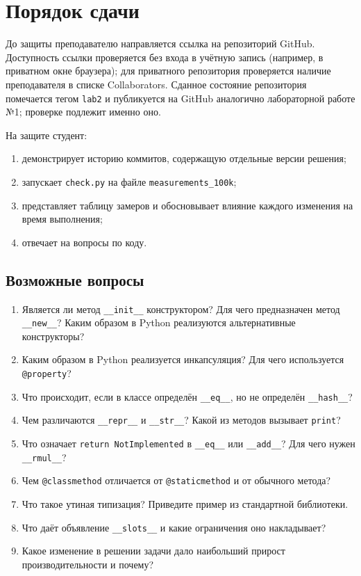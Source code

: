 \documentclass[11pt,a4paper]{article}
\newcommand{\code}[1]{\texttt{#1}}
\begin{document}
\section{Порядок сдачи}

До защиты преподавателю направляется ссылка на репозиторий GitHub. Доступность ссылки
проверяется без входа в учётную запись (например, в приватном окне браузера); для приватного
репозитория проверяется наличие преподавателя в списке Collaborators. Сданное состояние
репозитория помечается тегом \code{lab2} и публикуется на GitHub аналогично лабораторной
работе №1; проверке подлежит именно оно.

На защите студент:
\begin{enumerate}
  \item демонстрирует историю коммитов, содержащую отдельные версии решения;
  \item запускает \code{check.py} на файле \code{measurements\_100k};
  \item представляет таблицу замеров и обосновывает влияние каждого изменения на время выполнения;
  \item отвечает на вопросы по коду.
\end{enumerate}

\subsection*{Возможные вопросы}

\begin{enumerate}
  \item Является ли метод \code{\_\_init\_\_} конструктором? Для чего предназначен метод
        \code{\_\_new\_\_}? Каким образом в Python реализуются альтернативные конструкторы?
  \item Каким образом в Python реализуется инкапсуляция? Для чего используется \code{@property}?
  \item Что происходит, если в классе определён \code{\_\_eq\_\_}, но не определён \code{\_\_hash\_\_}?
  \item Чем различаются \code{\_\_repr\_\_} и \code{\_\_str\_\_}? Какой из методов вызывает \code{print}?
  \item Что означает \code{return NotImplemented} в \code{\_\_eq\_\_} или \code{\_\_add\_\_}?
        Для чего нужен \code{\_\_rmul\_\_}?
  \item Чем \code{@classmethod} отличается от \code{@staticmethod} и от обычного метода?
  \item Что такое утиная типизация? Приведите пример из стандартной библиотеки.
  \item Что даёт объявление \code{\_\_slots\_\_} и какие ограничения оно накладывает?
  \item Какое изменение в решении задачи дало наибольший прирост производительности и почему?
\end{enumerate}
\end{document}
